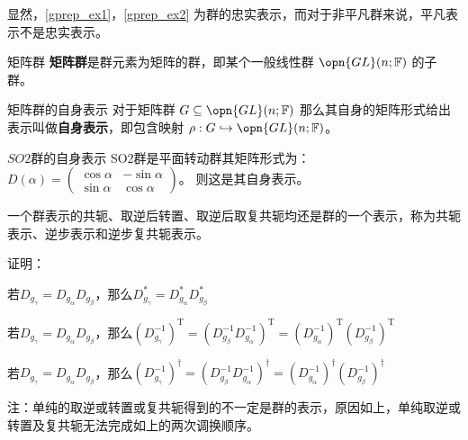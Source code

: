 显然，\autoref{gprep_ex1}，\autoref{gprep_ex2} 为群的忠实表示，而对于非平凡群来说，平凡表示不是忠实表示。

\begin{definition}{矩阵群}
\textbf{矩阵群}是群元素为矩阵的群，即某个一般线性群 $\opn{GL}(n; \mathbb{F})$ 的子群。
\end{definition}

\begin{definition}{矩阵群的自身表示}
对于矩阵群 $G \subseteq \opn{GL}(n; \mathbb{F})$ 那么其自身的矩阵形式给出表示叫做\textbf{自身表示}，即包含映射 $\rho: G \hookrightarrow \opn{GL}(n; \mathbb{F})$。
\end{definition}
\begin{example}{$SO2$群的自身表示}
SO2群是平面转动群其矩阵形式为：$D(\alpha)=\begin{pmatrix}
 \cos{\alpha} & -\sin{\alpha}\\
 \sin{\alpha} & \cos{\alpha}
\end{pmatrix}$。
则这是其自身表示。
\end{example}

\begin{corollary}{}
一个群表示的共轭、取逆后转置、取逆后取复共轭均还是群的一个表示，称为共轭表示、逆步表示和逆步复共轭表示。
\end{corollary}

证明：

若$D_{g_\gamma}=D_{g_\alpha}D_{g_\beta}$，那么$D_{g_\gamma}^*=D_{g_\alpha}^*D_{g_\beta}^*$

若$D_{g_\gamma}=D_{g_\alpha}D_{g_\beta}$，那么$(D_{g_\gamma}^{-1})^\mathrm{T}=(D_{g_\beta}^{-1}D_{g_\alpha}^{-1})^\mathrm{T}=(D_{g_\alpha}^{-1})^\mathrm{T}(D_{g_\beta}^{-1})^\mathrm{T}$

若$D_{g_\gamma}=D_{g_\alpha}D_{g_\beta}$，那么$(D_{g_\gamma}^{-1})^\dagger=(D_{g_\beta}^{-1}D_{g_\alpha}^{-1})^\dagger=(D_{g_\alpha}^{-1})^\dagger(D_{g_\beta}^{-1})^\dagger$

注：单纯的取逆或转置或复共轭得到的不一定是群的表示，原因如上，单纯取逆或转置及复共轭无法完成如上的两次调换顺序。